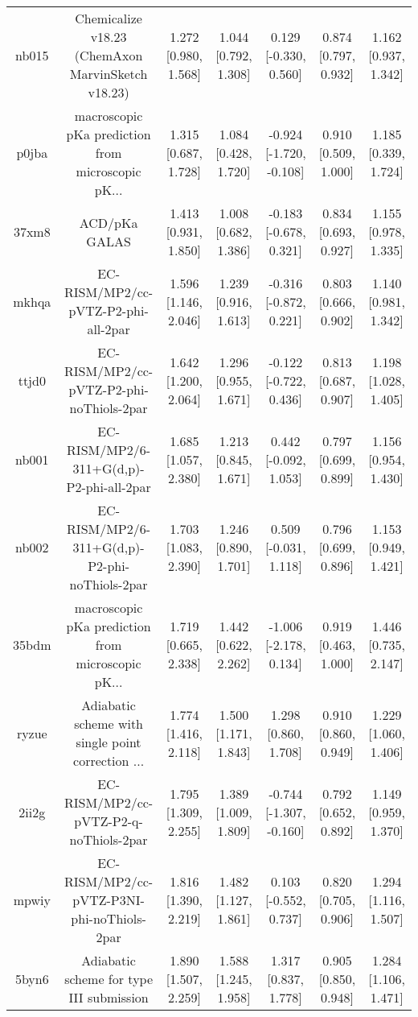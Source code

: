 \documentclass{article}
\begin{document}
\begin{center}
\begin{longtable}{|ccccccc|}
 nb015 &  Chemicalize v18.23 (ChemAxon MarvinSketch v18.23) &  1.272 [0.980, 1.568] &  1.044 [0.792, 1.308] &    0.129 [-0.330, 0.560] &  0.874 [0.797, 0.932] &   1.162 [0.937, 1.342] \\
 p0jba &  macroscopic pKa prediction from microscopic pK... &  1.315 [0.687, 1.728] &  1.084 [0.428, 1.720] &  -0.924 [-1.720, -0.108] &  0.910 [0.509, 1.000] &   1.185 [0.339, 1.724] \\
 37xm8 &                                      ACD/pKa GALAS &  1.413 [0.931, 1.850] &  1.008 [0.682, 1.386] &   -0.183 [-0.678, 0.321] &  0.834 [0.693, 0.927] &   1.155 [0.978, 1.335] \\
 mkhqa &                EC-RISM/MP2/cc-pVTZ-P2-phi-all-2par &  1.596 [1.146, 2.046] &  1.239 [0.916, 1.613] &   -0.316 [-0.872, 0.221] &  0.803 [0.666, 0.902] &   1.140 [0.981, 1.342] \\
 ttjd0 &           EC-RISM/MP2/cc-pVTZ-P2-phi-noThiols-2par &  1.642 [1.200, 2.064] &  1.296 [0.955, 1.671] &   -0.122 [-0.722, 0.436] &  0.813 [0.687, 0.907] &   1.198 [1.028, 1.405] \\
 nb001 &           EC-RISM/MP2/6-311+G(d,p)-P2-phi-all-2par &  1.685 [1.057, 2.380] &  1.213 [0.845, 1.671] &    0.442 [-0.092, 1.053] &  0.797 [0.699, 0.899] &   1.156 [0.954, 1.430] \\
 nb002 &      EC-RISM/MP2/6-311+G(d,p)-P2-phi-noThiols-2par &  1.703 [1.083, 2.390] &  1.246 [0.890, 1.701] &    0.509 [-0.031, 1.118] &  0.796 [0.699, 0.896] &   1.153 [0.949, 1.421] \\
 35bdm &  macroscopic pKa prediction from microscopic pK... &  1.719 [0.665, 2.338] &  1.442 [0.622, 2.262] &   -1.006 [-2.178, 0.134] &  0.919 [0.463, 1.000] &   1.446 [0.735, 2.147] \\
 ryzue &  Adiabatic scheme with single point correction ... &  1.774 [1.416, 2.118] &  1.500 [1.171, 1.843] &     1.298 [0.860, 1.708] &  0.910 [0.860, 0.949] &   1.229 [1.060, 1.406] \\
 2ii2g &             EC-RISM/MP2/cc-pVTZ-P2-q-noThiols-2par &  1.795 [1.309, 2.255] &  1.389 [1.009, 1.809] &  -0.744 [-1.307, -0.160] &  0.792 [0.652, 0.892] &   1.149 [0.959, 1.370] \\
 mpwiy &         EC-RISM/MP2/cc-pVTZ-P3NI-phi-noThiols-2par &  1.816 [1.390, 2.219] &  1.482 [1.127, 1.861] &    0.103 [-0.552, 0.737] &  0.820 [0.705, 0.906] &   1.294 [1.116, 1.507] \\
 5byn6 &           Adiabatic scheme for type III submission &  1.890 [1.507, 2.259] &  1.588 [1.245, 1.958] &     1.317 [0.837, 1.778] &  0.905 [0.850, 0.948] &   1.284 [1.106, 1.471] \\

\end{longtable}
\end{center}
\end{document}
